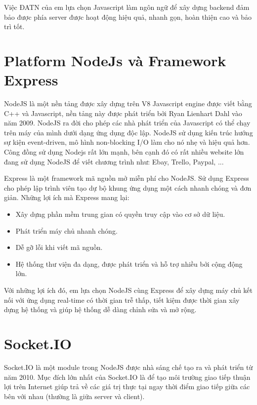 \documentclass[../DoAn.tex]{subfiles}
\begin{document}
Việc ĐATN của em lựa chọn Javascript làm ngôn ngữ để xây dựng backend đảm bảo được phía server được hoạt động hiệu quả, nhanh gọn, hoàn thiện cao và bảo trì tốt.

\section{Platform NodeJs và Framework Express}
\label{section:3.3}

NodeJS là một nền tảng được xây dựng trên V8 Javascript engine\cite{V8_Javascript_engine} được viết bằng C++ và Javascript, nền tảng này được phát triển bởi Ryan Lienhart Dahl vào năm 2009. NodeJS ra đời cho phép các nhà phát triển của Javascript có thể chạy trên máy của mình dưới dạng ứng dụng độc lập. NodeJS sử dụng kiến trúc hướng sự kiện event-driven, mô hình non-blocking I/O làm cho nó nhẹ và hiệu quả hơn. Công đồng sử dụng Nodejs rất lớn mạnh, bên cạnh đó có rất nhiều website lớn đang sử dụng NodeJS để viết chương trình như: Ebay, Trello, Paypal, ...

Express là một framework mã nguồn mở miễn phí cho NodeJS. Sử dụng Express cho phép lập trình viên tạo dự bộ khung ứng dụng một cách nhanh chóng và đơn giản. Những lợi ích mà Express mang lại:
\begin{itemize}
    \item Xây dựng phần mềm trung gian có quyền truy cập vào cơ sở dữ liệu.
    \item Phát triển máy chủ nhanh chóng.
    \item Dễ gỡ lỗi khi viết mã nguồn.
    \item Hệ thống thư viện đa dạng, được phát triển và hỗ trợ nhiều bởi cộng động lớn.
\end{itemize}

Với những lợi ích đó, em lựa chọn NodeJS cùng Express để xây dựng máy chủ kết nối với ứng dụng real-time có thời gian trễ thấp, tiết kiệm được thời gian xây dựng hệ thống và giúp hệ thống dễ dàng chỉnh sửa và mở rộng.

\section{Socket.IO}
\label{section:3.4}

Socket.IO là một module trong NodeJS được nhà sáng chế tạo ra và phát triển từ năm 2010. Mục đích lớn nhất của Socket.IO là để tạo môi trường giao tiếp thuận lợi trên Internet giúp trả về các giá trị thực tại ngay thời điểm giao tiếp giữa các bên với nhau (thường là giữa server và client).
\end{document}

